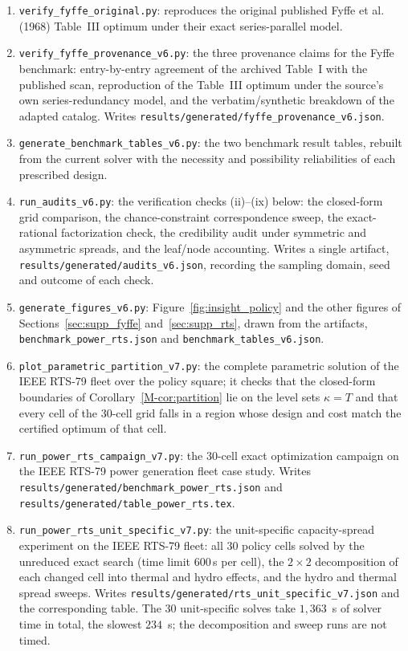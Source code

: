 \documentclass[11pt]{article}
\newcommand{\new}[1]{#1}
\begin{document}
\begin{enumerate}
\item \texttt{verify\_fyffe\_original.py}: reproduces the original published Fyffe et al. (1968) Table~III optimum under their exact series-parallel model.
\item \texttt{verify\_fyffe\_provenance\_v6.py}: the three provenance claims for the Fyffe benchmark: entry-by-entry agreement of the archived Table~I with the published scan, reproduction of the Table~III optimum under the source's own series-redundancy model, and the verbatim/synthetic breakdown of the adapted catalog. Writes \texttt{results/generated/fyffe\_provenance\_v6.json}.
\item \texttt{generate\_benchmark\_tables\_v6.py}: the two benchmark result tables, rebuilt from the current solver with the necessity and possibility reliabilities of each prescribed design.
\item \texttt{run\_audits\_v6.py}: the verification checks (ii)--(ix) below: the closed-form grid comparison, the chance-constraint correspondence sweep, the exact-rational factorization check, the credibility audit under symmetric and asymmetric spreads, and the leaf/node accounting. Writes a single artifact, \texttt{results/generated/audits\_v6.json}, recording the sampling domain, seed and outcome of each check.
\item \new{\texttt{generate\_figures\_v6.py}: Figure~\ref{fig:insight_policy} and the other figures of Sections~\ref{sec:supp_fyffe} and~\ref{sec:supp_rts}, drawn from the artifacts, \texttt{benchmark\_power\_rts.json} and \texttt{benchmark\_tables\_v6.json}.}
\item \new{\texttt{plot\_parametric\_partition\_v7.py}: the complete parametric solution of the IEEE RTS-79 fleet over the policy square; it checks that the closed-form boundaries of Corollary~\ref*{M-cor:partition} lie on the level sets $\kappa = T$ and that every cell of the $30$-cell grid falls in a region whose design and cost match the certified optimum of that cell.}
\item \new{\texttt{run\_power\_rts\_campaign\_v7.py}: the $30$-cell exact optimization campaign on the IEEE RTS-79 power generation fleet case study. Writes \texttt{results/generated/benchmark\_power\_rts.json} and \texttt{results/generated/table\_power\_rts.tex}.}
\item \texttt{run\_power\_rts\_unit\_specific\_v7.py}: the unit-specific capacity-spread experiment on the IEEE RTS-79 fleet: all $30$ policy cells solved by the unreduced exact search (time limit $600$\,s per cell), the $2\times2$ decomposition of each changed cell into thermal and hydro effects, and the hydro and thermal spread sweeps. Writes \texttt{results/generated/rts\_unit\_specific\_v7.json} and the corresponding table. The $30$ unit-specific solves take $1{,}363$~s of solver time in total, the slowest $234$~s; the decomposition and sweep runs are not timed.

\end{enumerate}
\end{document}
